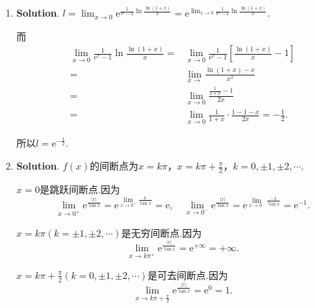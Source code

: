 \documentclass[../Main.tex]{subfiles}
\begin{document}
\begin{enumerate}
      \[
        \begin{aligned}
          b = & \lim_{x\to+\infty}\left(\sqrt{2x^2+4x-1}-ax\right)=\lim_{x\to\infty}\left(\sqrt{2x^2+4x-1}-\sqrt{2}x\right) \\
          =   & \lim_{x\to+\infty}\sqrt{2}x\left[\sqrt{1+\left(\frac{2}{x}-\frac{1}{2x^2}\right)}-1\right]                  \\
          =   & \lim_{x\to+\infty}\sqrt{2}x\cdot\frac{1}{2}\left(\frac{2}{x}-\frac{1}{2x^2}\right)=\sqrt{2}.
        \end{aligned}
      \]

    \item \textbf{Solution}. $l=\lim_{x\to0}\mathrm{e}^{\frac{1}{\mathrm{e}^{x}-1}\ln\frac{\ln(1+x)}{x}}
      =\mathrm{e}^{\lim_{x\to0}\frac{1}{\mathrm{e}^{x}-1}\ln\frac{\ln(1+x)}{x}}$.

      而
      \[
        \begin{aligned}
          \lim_{x\to0}\frac{1}{\mathrm{e}^x-1}\ln\frac{\ln(1+x)}{x}= & \lim_{x\to0}\frac{1}{\mathrm{e}^x-1}\left[\frac{\ln(1+x)}{x}-1\right] \\
          =                                                          & \lim_{x\to}\frac{\ln(1+x)-x}{x^2}                                     \\
          =                                                          & \lim_{x\to0}\frac{\frac{1}{1+x}-1}{2x}                                \\
          =                                                          & \lim_{x\to0}\frac{1}{1+x}\cdot\frac{1-1-x}{2x}=-\frac{1}{2}.
        \end{aligned}
      \]

      所以$l=\mathrm{e}^{-\frac{1}{2}}$.

    \item \textbf{Solution}. $f(x)$的间断点为$x=k\pi$，$x=k\pi+\frac{\pi}{2}$，$k
      =0,\pm1,\pm2,\cdots$.

      $x=0$是跳跃间断点.因为
      \[
        \lim_{x\to0^+}\mathrm{e}^{\frac{|x|}{\tan x}}=\mathrm{e}^{\lim_{x\to0^+}\frac{x}{\tan
        x}}=\mathrm{e},\quad \lim_{x\to0^-}\mathrm{e}^{\frac{|x|}{\tan x}}=\mathrm{e}
        ^{\lim_{x\to0^-}\frac{-x}{\tan x}}=\mathrm{e}^{-1}.
      \]

      $x=k\pi(k=\pm1,\pm2,\cdots)$是无穷间断点.因为
      \[
        \lim_{x\to k\pi^+}\mathrm{e}^{\frac{|x|}{\tan x}}=\mathrm{e}^{+\infty}=+\infty
        .
      \]

      $x=k\pi+\frac{\pi}{2}(k=0,\pm1,\pm2,\cdots)$是可去间断点.因为
      \[
        \lim_{x\to k\pi+\frac{\pi}{2}}\mathrm{e}^{\frac{|x|}{\tan x}}=\mathrm{e}^{0}
        =1.
      \]


\end{enumerate}
\end{document}
